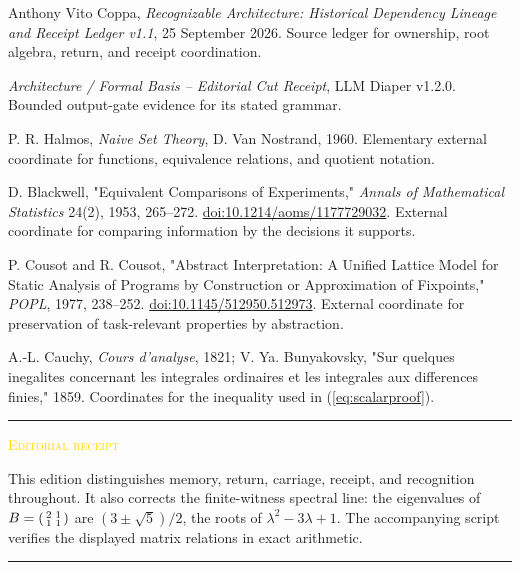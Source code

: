 \documentclass[11pt]{article}
\newcommand{\smallcaps}[1]{{\footnotesize\textsc{#1}}}
\newcommand{\eqrefn}[1]{(\ref{#1})}
\newenvironment{claimbox}[1]{%
  \par\vspace{0.55em}\noindent\begin{minipage}{\linewidth}
  \color{line}\rule{\linewidth}{0.55pt}\par\vspace{0.34em}%
  \textcolor{gold}{\smallcaps{#1}}\par\vspace{0.3em}\color{ink}%
}{%
  \par\vspace{0.38em}\color{line}\rule{\linewidth}{0.55pt}%
  \end{minipage}\par\vspace{0.55em}%
}
\begin{document}
\begin{enumerate}[label={[\arabic*]},leftmargin=2.1em]
  \item Anthony Vito Coppa, \textit{Recognizable Architecture: Historical Dependency Lineage and Receipt Ledger v1.1}, 25 September 2026. Source ledger for ownership, root algebra, return, and receipt coordination.
  \item \textit{Architecture / Formal Basis -- Editorial Cut Receipt}, LLM Diaper v1.2.0. Bounded output-gate evidence for its stated grammar.
  \item P. R. Halmos, \textit{Naive Set Theory}, D. Van Nostrand, 1960. Elementary external coordinate for functions, equivalence relations, and quotient notation.
  \item D. Blackwell, "Equivalent Comparisons of Experiments," \textit{Annals of Mathematical Statistics} 24(2), 1953, 265--272. \href{https://doi.org/10.1214/aoms/1177729032}{doi:10.1214/aoms/1177729032}. External coordinate for comparing information by the decisions it supports.
  \item P. Cousot and R. Cousot, "Abstract Interpretation: A Unified Lattice Model for Static Analysis of Programs by Construction or Approximation of Fixpoints," \textit{POPL}, 1977, 238--252. \href{https://doi.org/10.1145/512950.512973}{doi:10.1145/512950.512973}. External coordinate for preservation of task-relevant properties by abstraction.
  \item A.-L. Cauchy, \textit{Cours d'analyse}, 1821; V. Ya. Bunyakovsky, "Sur quelques inegalites concernant les integrales ordinaires et les integrales aux differences finies," 1859. Coordinates for the inequality used in \eqrefn{eq:scalarproof}.
\end{enumerate}

\vspace{1em}
\begin{claimbox}{Editorial receipt}
This edition distinguishes memory, return, carriage, receipt, and recognition throughout. It also corrects the finite-witness spectral line: the eigenvalues of $B=\begin{psmallmatrix}2&1\\1&1\end{psmallmatrix}$ are $(3\pm\sqrt5)/2$, the roots of $\lambda^2-3\lambda+1$. The accompanying script verifies the displayed matrix relations in exact arithmetic.
\end{claimbox}
\end{document}
